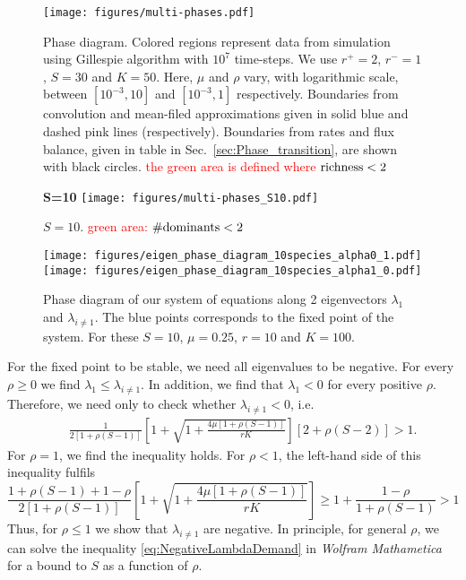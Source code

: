 \documentclass[%
 amsmath,amssymb,
 reprint,%
]{revtex4-2}
\begin{document}
\begin{widetext}
\begin{figure}
    \centering
     \texttt{[image: figures/multi-phases.pdf]}
    \caption{Phase diagram.  Colored regions represent data from simulation using Gillespie algorithm with $10^7$ time-steps. We use $r^+=2$, $r^-=1$, $S=30$ and $K=50$. Here, $\mu$ and $\rho$ vary, with logarithmic scale, between $[10^{-3}, 10]$ and $[10^{-3}, 1]$ respectively.  Boundaries from convolution and mean-filed approximations given in solid blue and dashed pink lines (respectively). Boundaries from rates and flux balance, given in table in Sec.~\ref{sec:Phase_transition}, are shown with black circles.  \textcolor{red}{the green area is defined where ${\rm richness}<2$}  }
    \label{fig:Multi-phases_sim}
\end{figure}
\begin{figure}
    \centering
 {\bf S=10}
     \texttt{[image: figures/multi-phases\_S10.pdf]}
    \caption{$S=10$.  \textcolor{red}{green area: $\#{\rm dominants}<2$}  }
    \label{fig:Multi-phases_sim}
\end{figure}

\begin{figure}
\texttt{[image: figures/eigen\_phase\_diagram\_10species\_alpha0\_1.pdf]}
\texttt{[image: figures/eigen\_phase\_diagram\_10species\_alpha1\_0.pdf]}
\caption{Phase diagram of our system of equations along 2 eigenvectors $\lambda_1$ and $\lambda_{i\neq 1}$. The blue points corresponds to the fixed point of the system. For these $S=10$, $\mu=0.25$, $r=10$ and $K=100$.}
\label{det_eigvec}
\end{figure}

For the fixed point to be stable, we need all eigenvalues to be negative. 
For every $\rho\geq 0$ we find $\lambda_1\leq \lambda_{i\neq 1}$. In addition, we find that $\lambda_1<0$ for every positive $\rho$. Therefore, we need only to check whether $\lambda_{i\neq 1} < 0 $, i.e. 
\begin{eqnarray}
&&\frac{1}{2[1+\rho(S-1)]}\left[1+ \sqrt{1+\frac{4\mu[1+\rho(S-1)]}{r K}}\right][2+\rho (S-2) ]>1. 
\label{eq:NegativeLambdaDemand}
\end{eqnarray}
For $\rho=1$, we find the inequality holds. For $\rho<1$, the left-hand side of this inequality fulfils
\begin{equation}
    \frac{1+\rho (S-1) +1 -\rho }{2[1+\rho(S-1)]}\left[1+ \sqrt{1+\frac{4\mu[1+\rho(S-1)]}{r K}}\right] \geq 1+\frac{1-\rho}{1+\rho(S-1)}>1
\end{equation} 
Thus, for $\rho\leq 1$ we show that  $\lambda_{i\neq 1}$ are negative.  
In principle, for general $\rho$, we can solve the inequality \eqref{eq:NegativeLambdaDemand} in \textit{Wolfram Mathametica} for a bound to $S$ as a function of $\rho$.


\end{widetext}
\end{document}
